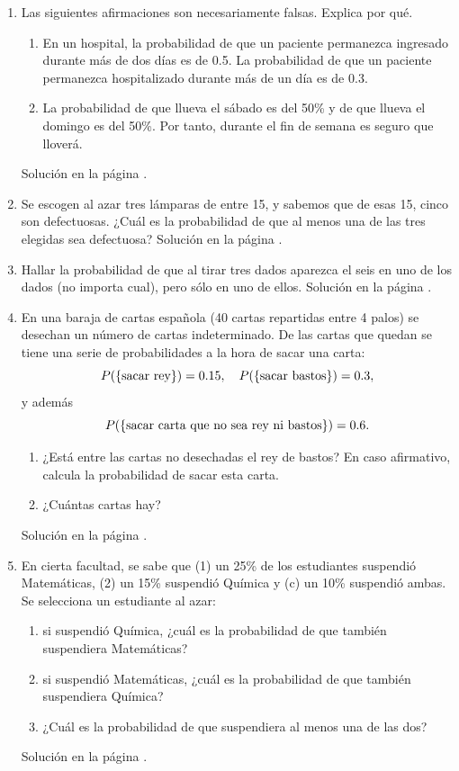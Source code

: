 \documentclass[10pt,a4paper]{article}\usepackage[]{graphicx}\usepackage[]{color}
\begin{document}
\begin{enumerate}
\item \label{tut03:ejercicio22} Las siguientes afirmaciones son necesariamente falsas. Explica por qué.
\begin{enumerate}
     \item En un hospital, la probabilidad de que un paciente permanezca ingresado durante m\'as de dos d\'ias  es de 0.5. La probabilidad de que un paciente permanezca hospitalizado durante m\'as de un d\'ia es de 0.3.
     \item La probabilidad de que llueva el s\'abado es del 50\% y de que llueva el domingo es del 50\%. Por tanto, durante el fin de semana es seguro que llover\'a.
\end{enumerate}
Solución en la página \pageref{tut03:ejercicio22:sol}. 



\item \label{tut03:ejercicio23} Se escogen al azar tres lámparas de entre 15, y sabemos que de esas 15, cinco son defectuosas. ¿Cuál es la probabilidad de que al menos una de las tres elegidas sea defectuosa? 
Solución en la página \pageref{tut03:ejercicio23:sol}.   

\item \label{tut03:ejercicio24} Hallar la probabilidad de que al tirar tres dados aparezca el seis en uno de los dados (no importa cual), pero sólo en uno de ellos.     
Solución en la página \pageref{tut03:ejercicio24:sol}. 


\item \label{tut03:ejercicio25} En una baraja de cartas espa\~nola (40 cartas repartidas entre 4 palos) se desechan un n\'umero de cartas indeterminado. De las cartas que quedan se tiene una serie de probabilidades a la hora de sacar una carta:
$$P(\{\hbox{sacar rey}\})=0.15,\quad P(\{\hbox{sacar bastos}\})=0.3,$$
y adem\'as
$$P(\{\hbox{sacar carta que no sea rey ni bastos}\})=0.6.$$
\begin{enumerate}
     \item ¿Est\'a entre las cartas no desechadas el rey de bastos? En caso afirmativo, calcula la probabilidad de sacar esta carta.
     \item ¿Cu\'antas cartas hay?
\end{enumerate}
Solución en la página \pageref{tut03:ejercicio25:sol}. 


\item  \label{tut03:ejercicio26}  En cierta facultad, se sabe que (1) un 25\% de los estudiantes suspendió Matemáticas, (2) un 15\% suspendió Química y (c) un 10\% suspendió ambas. Se selecciona un estudiante al azar:
\begin{enumerate}
\item si suspendió Química, ¿cuál es la probabilidad de que también suspendiera Matemáticas?
\item si suspendió Matemáticas, ¿cuál es la probabilidad de que también suspendiera Química?
\item ¿Cuál es la probabilidad de que suspendiera al menos una de las dos?
\end{enumerate}
Solución en la página \pageref{tut03:ejercicio26:sol}. 


\end{enumerate}
\end{document}
